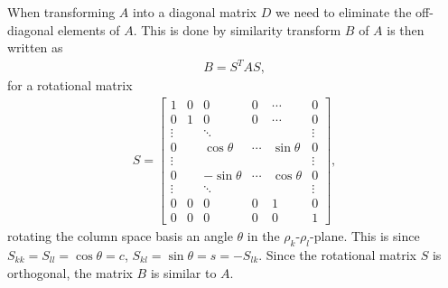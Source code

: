 \documentclass[twocolumn]{aastex62}
\begin{document}
When transforming $A$ into a diagonal matrix $D$ we need to eliminate the off-diagonal elements of $A$. This is done by similarity transform $B$ of $A$ is then written as
\begin{align}
	B = S^T A S,
\end{align}
for a rotational matrix
\begin{align}
S =
	\begin{bmatrix}
		1 & 0 & 0 & 0 & \cdots & 0\\
		0 & 1 & 0 & 0 & \cdots & 0 \\
		\vdots & & \ddots & & & \vdots \\
		0 & & \cos\theta & \cdots & \sin\theta & 0\\
		\vdots & & & & & \vdots \\
		0 & & -\sin\theta & \cdots & \cos\theta & 0\\
		\vdots & & \ddots & & & \vdots \\
		0 & 0 & 0 & 0 & 1 & 0\\
		0 & 0 & 0 & 0 & 0 & 1
	\end{bmatrix},
\end{align}
rotating the column space basis an angle $\theta$ in the $\rho_k$-$\rho_l$-plane. This is since $S_{kk} = S_{ll} = \cos\theta = c$, $S_{kl} = \sin\theta = s = -S_{lk}$. Since the rotational matrix $S$ is orthogonal, the matrix $B$ is similar to $A$.
\end{document}
